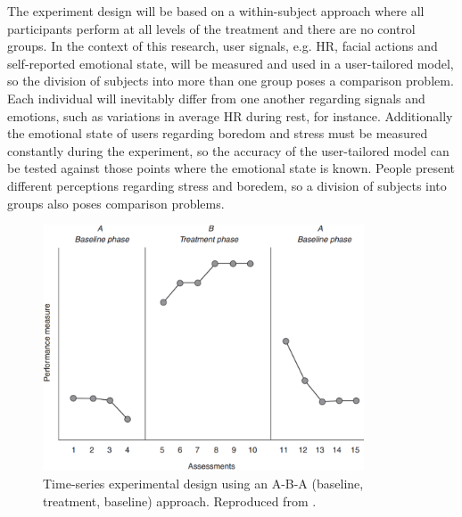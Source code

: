 The experiment design will be based on a within-subject approach \parencite{lane2015online} where all participants perform at all levels of the treatment and there are no control groups. In the context of this research, user signals, e.g. HR, facial actions and self-reported emotional state, will be measured and used in a user-tailored model, so the division of subjects into more than one group poses a comparison problem. Each individual will inevitably differ from one another regarding signals and emotions, such as variations in average HR during rest, for instance. Additionally the emotional state of users regarding boredom and stress must be measured constantly during the experiment, so the accuracy of the user-tailored model can be tested against those points where the emotional state is known. People present different perceptions regarding stress and boredem, so a division of subjects into groups also poses comparison problems.

\begin{figure}[ht]
    \centering
    \includegraphics[width=0.85\textwidth]{figures/time-series-design-breakwell.png}
    \caption{Time-series experimental design using an A-B-A (baseline, treatment, baseline) approach. Reproduced from \textcite{breakwell1994research}.}
    \label{fig:time-series-design-breakwell}
\end{figure}

